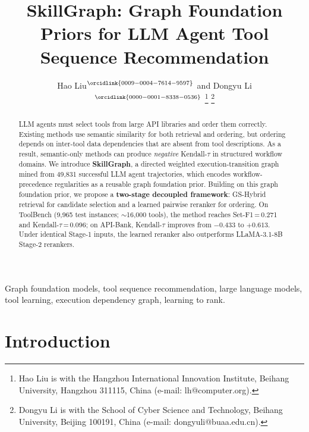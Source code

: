 \documentclass[lettersize,journal]{IEEEtran}
\begin{document}
\title{SkillGraph: Graph Foundation Priors for LLM Agent Tool Sequence Recommendation}

\author{Hao Liu$^{\orcidlink{0009-0004-7614-9597}}$
and Dongyu Li$^{\orcidlink{0000-0001-8338-0536}}$%
\thanks{Hao Liu is with the Hangzhou International Innovation Institute, Beihang University, Hangzhou 311115, China (e-mail: lh@computer.org).}%
\thanks{Dongyu Li is with the School of Cyber Science and Technology, Beihang University, Beijing 100191, China (e-mail: dongyuli@buaa.edu.cn).}
}

\maketitle

\begin{abstract}
LLM agents must select tools from large API libraries and order them correctly. Existing methods use semantic similarity for both retrieval and ordering, but ordering depends on inter-tool data dependencies that are absent from tool descriptions. As a result, semantic-only methods can produce \emph{negative} Kendall-$\tau$ in structured workflow domains. We introduce \textbf{SkillGraph}, a directed weighted execution-transition graph mined from 49,831 successful LLM agent trajectories, which encodes workflow-precedence regularities as a reusable graph foundation prior.
Building on this graph foundation prior, we propose a \textbf{two-stage decoupled framework}: GS-Hybrid retrieval for candidate selection and a learned pairwise reranker for ordering. On ToolBench (9,965 test instances; $\sim$16,000 tools), the method reaches Set-F1\,=\,0.271 and Kendall-$\tau$\,=\,0.096; on API-Bank, Kendall-$\tau$ improves from $-0.433$ to $+0.613$.
Under identical Stage-1 inputs, the learned reranker also outperforms LLaMA-3.1-8B Stage-2 rerankers.
\end{abstract}

\begin{IEEEkeywords}
Graph foundation models, tool sequence recommendation, large language models, tool learning, execution dependency graph, learning to rank.
\end{IEEEkeywords}


\section{Introduction}
\label{sec:intro}
\end{document}
